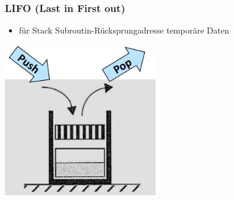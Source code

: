 \subsubsection{LIFO (Last in First out)}
\begin{itemize}
    \item für Stack
    \subitem Subroutin-Rücksprungadresse
    \subitem temporäre Daten
\end{itemize}
\begin{minipage}{0.5\linewidth}
    \includegraphics[width=0.5\textwidth]{images/SystembusSpeicherSpeichersystem/SpeicherSysLIFO}
\end{minipage}\newline

